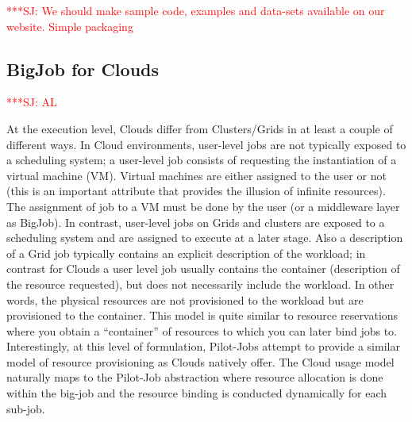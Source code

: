 \documentclass[conference,final]{IEEEtran}
\newcommand{\jhanote}[1]{ {\textcolor{red} { ***SJ: #1 }}}
\newcommand{\jhanote}[1]{}
\begin{document}
\jhanote{We should make sample code, examples and data-sets available
  on our website. Simple packaging}

\subsection{BigJob for Clouds} \jhanote{AL}


At the execution level, Clouds differ from Clusters/Grids in at least
a couple of different ways. In Cloud environments, user-level jobs are
not typically exposed to a scheduling system; a user-level job
consists of requesting the instantiation of a virtual machine (VM).
Virtual machines are either assigned to the user or not (this is an
important attribute that provides the illusion of infinite resources).
The assignment of job to a VM must be done by the user (or a
middleware layer as BigJob).  In contrast, user-level jobs on Grids
and clusters are exposed to a scheduling system and are assigned to
execute at a later stage.  Also a description of a Grid job
typically contains an explicit description of the workload; in contrast
for Clouds a user level job usually contains the container
(description of the resource requested), but does not necessarily
include the workload. In other words, the physical resources are not
provisioned to the workload but are provisioned to the container.
This model is quite similar to resource reservations where you obtain
a ``container'' of resources to which you can later bind jobs
to. Interestingly, at this level of formulation, Pilot-Jobs attempt to
provide a similar model of resource provisioning as Clouds natively
offer. The Cloud usage model naturally maps to the Pilot-Job abstraction 
where resource allocation is done within the big-job and the resource 
binding is conducted dynamically for each sub-job.
\end{document}
